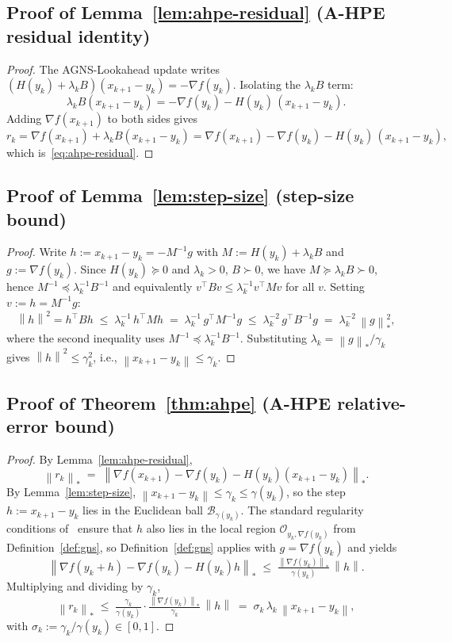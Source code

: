 \documentclass[conference]{IEEEtran}
\theoremstyle{remark}
\newcommand{\dnorm}[1]{\left\lVert#1\right\rVert_*}
\newcommand{\norm}[1]{\left\lVert#1\right\rVert}
\begin{document}
\subsection{Proof of Lemma~\ref{lem:ahpe-residual} (A-HPE residual identity)}

\begin{proof}
The AGNS-Lookahead update writes
$(H(y_k) + \lambda_k B)(x_{k+1} - y_k) = -\nabla f(y_k)$.
Isolating the $\lambda_k B$ term:
\[
  \lambda_k B(x_{k+1} - y_k) = -\nabla f(y_k) - H(y_k)\,(x_{k+1} - y_k).
\]
Adding $\nabla f(x_{k+1})$ to both sides gives
\[
  r_k = \nabla f(x_{k+1}) + \lambda_k B(x_{k+1} - y_k)
      = \nabla f(x_{k+1}) - \nabla f(y_k) - H(y_k)\,(x_{k+1} - y_k),
\]
which is~\eqref{eq:ahpe-residual}.
\end{proof}

\subsection{Proof of Lemma~\ref{lem:step-size} (step-size bound)}

\begin{proof}
Write $h := x_{k+1} - y_k = -M^{-1} g$ with $M := H(y_k) + \lambda_k B$
and $g := \nabla f(y_k)$. Since $H(y_k) \succeq 0$ and $\lambda_k > 0$,
$B \succ 0$, we have $M \succeq \lambda_k B \succ 0$, hence
$M^{-1} \preceq \lambda_k^{-1} B^{-1}$ and equivalently
$v^\top B v \le \lambda_k^{-1} v^\top M v$ for all $v$. Setting
$v := h = M^{-1} g$:
\[
  \norm{h}^2 = h^\top B h
  \;\le\; \lambda_k^{-1}\, h^\top M h
  \;=\; \lambda_k^{-1}\, g^\top M^{-1} g
  \;\le\; \lambda_k^{-2}\, g^\top B^{-1} g
  \;=\; \lambda_k^{-2}\, \dnorm{g}^2,
\]
where the second inequality uses $M^{-1} \preceq \lambda_k^{-1} B^{-1}$.
Substituting $\lambda_k = \dnorm{g}/\gamma_k$ gives
$\norm{h}^2 \le \gamma_k^2$, i.e., $\norm{x_{k+1} - y_k} \le \gamma_k$.
\end{proof}

\subsection{Proof of Theorem~\ref{thm:ahpe} (A-HPE relative-error bound)}

\begin{proof}
By Lemma~\ref{lem:ahpe-residual},
\[
\dnorm{r_k} \;=\; \dnorm{\nabla f(x_{k+1}) - \nabla f(y_k) - H(y_k)(x_{k+1} - y_k)}.
\]
By Lemma~\ref{lem:step-size}, $\norm{x_{k+1} - y_k} \le \gamma_k \le
\gamma(y_k)$, so the step $h := x_{k+1} - y_k$ lies in the Euclidean
ball $\mathcal{B}_{\gamma(y_k)}$. The standard regularity conditions
of~\cite[Lemma~1]{semenov2025gradient} ensure that $h$ also lies in
the local region $\mathcal{O}_{y_k, \nabla f(y_k)}$ from
Definition~\ref{def:gns}, so Definition~\ref{def:gns} applies with
$g = \nabla f(y_k)$ and yields
\[
  \dnorm{\nabla f(y_k + h) - \nabla f(y_k) - H(y_k) h}
  \;\le\; \tfrac{\dnorm{\nabla f(y_k)}}{\gamma(y_k)}\, \norm{h}.
\]
Multiplying and dividing by $\gamma_k$,
\[
\dnorm{r_k}
\;\le\; \tfrac{\gamma_k}{\gamma(y_k)} \cdot \tfrac{\dnorm{\nabla f(y_k)}}{\gamma_k}\, \norm{h}
\;=\; \sigma_k \, \lambda_k\, \norm{x_{k+1} - y_k},
\]
with $\sigma_k := \gamma_k / \gamma(y_k) \in [0, 1]$.
\end{proof}
\end{document}

